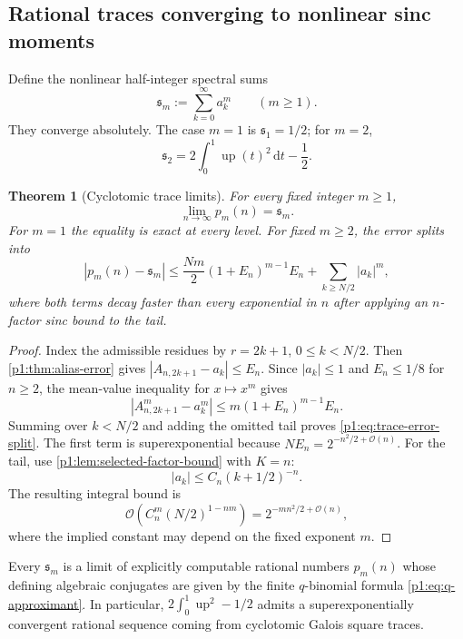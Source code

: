 \documentclass[11pt,oneside]{article}
\newtheorem{theorem}{Theorem}[section]
\theoremstyle{definition}
\theoremstyle{remark}
\newcommand{\Up}{\operatorname{up}}
\newcommand{\dd}{\,\mathrm d}
\newcommand{\bigO}{\mathcal O}
\begin{document}
\subsection{Rational traces converging to nonlinear sinc moments}

Define the nonlinear half-integer spectral sums
\begin{equation}\label{p1:eq:spectral-power-sums}
 \mathfrak s_m:=\sum_{k=0}^{\infty}a_k^m
 \qquad(m\ge1).
\end{equation}
They converge absolutely.  The case $m=1$ is $\mathfrak s_1=1/2$; for $m=2$,
\begin{equation}\label{p1:eq:s2-L2}
 \mathfrak s_2=2\int_0^1\Up(t)^2\dd t-\frac12.
\end{equation}

\begin{theorem}[Cyclotomic trace limits]\label{p1:thm:trace-limits}
For every fixed integer $m\ge1$,
\begin{equation}\label{p1:eq:trace-limit}
 \boxed{
 \lim_{n\to\infty}p_m(n)=\mathfrak s_m.}
\end{equation}
For $m=1$ the equality is exact at every level.  For fixed $m\ge2$, the error
splits into
\begin{equation}\label{p1:eq:trace-error-split}
 |p_m(n)-\mathfrak s_m|
 \le \frac{Nm}{2}(1+E_n)^{m-1}E_n
 +\sum_{k\ge N/2}|a_k|^m,
\end{equation}
where both terms decay faster than every exponential in $n$ after applying an
$n$-factor sinc bound to the tail.
\end{theorem}

\begin{proof}
Index the admissible residues by $r=2k+1$, $0\le k<N/2$.  Then
\cref{p1:thm:alias-error} gives
$|A_{n,2k+1}-a_k|\le E_n$.  Since $|a_k|\le1$ and $E_n\le1/8$ for $n\ge2$,
the mean-value inequality for $x\mapsto x^m$ gives
\[
 |A_{n,2k+1}^m-a_k^m|
 \le m(1+E_n)^{m-1}E_n.
\]
Summing over $k<N/2$ and adding the omitted tail proves
\eqref{p1:eq:trace-error-split}.  The first term is superexponential because
$NE_n=2^{-n^2/2+\bigO(n)}$.  For the tail, use
\cref{p1:lem:selected-factor-bound} with $K=n$:
\[
 |a_k|\le C_n(k+1/2)^{-n}.
\]
The resulting integral bound is
\[
 \bigO\!\left(C_n^m(N/2)^{1-nm}\right)
 =2^{-mn^2/2+\bigO(n)},
\]
where the implied constant may depend on the fixed exponent $m$.
\end{proof}

\begin{corollary}\label{p1:cor:algebraic-spectral-norms}
Every $\mathfrak s_m$ is a limit of explicitly computable rational numbers
$p_m(n)$ whose defining algebraic conjugates are given by the finite
$q$-binomial formula \eqref{p1:eq:q-approximant}.  In particular,
$2\int_0^1\Up^2-1/2$ admits a superexponentially convergent rational sequence
coming from cyclotomic Galois square traces.
\end{corollary}
\end{document}
